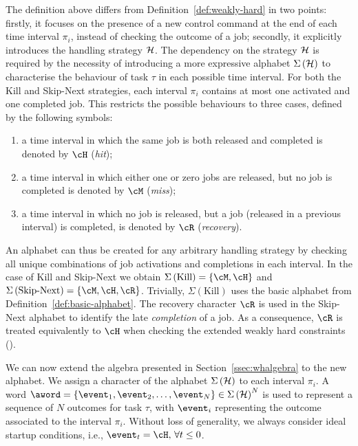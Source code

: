 The definition above differs from Definition~\ref{def:weakly-hard} in two points: firstly, it focuses on the presence of a new control command at the end of each time interval $\pi_i$, instead of checking the outcome of a job; secondly, it explicitly introduces the handling strategy $\mathcal{H}$.
%
The dependency on the strategy $\mathcal{H}$ is required by the necessity of introducing a more expressive alphabet $\Sigma\left(\mathcal{H}\right)$ to characterise the behaviour of task $\tau$ in each possible time interval.
For both the Kill and Skip-Next strategies, each interval $\pi_i$ contains at most one activated and one completed job.
This restricts the possible behaviours to three cases, defined by the following symbols:
%
\begin{enumerate}[label=(\roman*)]
    \item a time interval in which the same job is both released and completed is denoted by $\cH$ (\emph{hit});
    \item a time interval in which either one or zero jobs are released, but no job is completed is denoted by $\cM$ (\emph{miss});
    \item a time interval in which no job is released, but a job (released in a previous interval) is completed, is denoted by $\cR$ (\emph{recovery}).
\end{enumerate}
%
An alphabet can thus be created for any arbitrary handling strategy by checking all unique combinations of job activations and completions in each interval. 
In the case of Kill and Skip-Next we obtain $\Sigma\left(\text{Kill}\right) = \{ \cM, \cH \}$ and $\Sigma\left(\text{Skip-Next}\right) = \{ \cM, \cH, \cR \}$.
Trivially, $\Sigma\left(\text{Kill}\right)$ uses the basic alphabet from Definition~\ref{def:basic-alphabet}.
The recovery character $\cR$ is used in the Skip-Next alphabet to identify the late \emph{completion} of a job.
As a consequence, $\cR$ is treated equivalently to $\cH$ when checking the extended weakly hard constraints (\ewhc{}).

We can now extend the algebra presented in Section~\ref{ssec:whalgebra} to the new alphabet.
We assign a character of the alphabet $\Sigma\left(\mathcal{H}\right)$ to each interval $\pi_i$.
A word $\aword = \{\event_1,\event_2,\dots,\event_N \} \in \Sigma\left(\strat\right)^N$ is used to represent a sequence of $N$ outcomes for task $\tau$, with $\event_i$ representing the outcome associated to the interval $\pi_i$. 
Without loss of generality, we always consider ideal startup conditions, i.e., $\event_t=\cH, \, \forall t \leq 0$.

